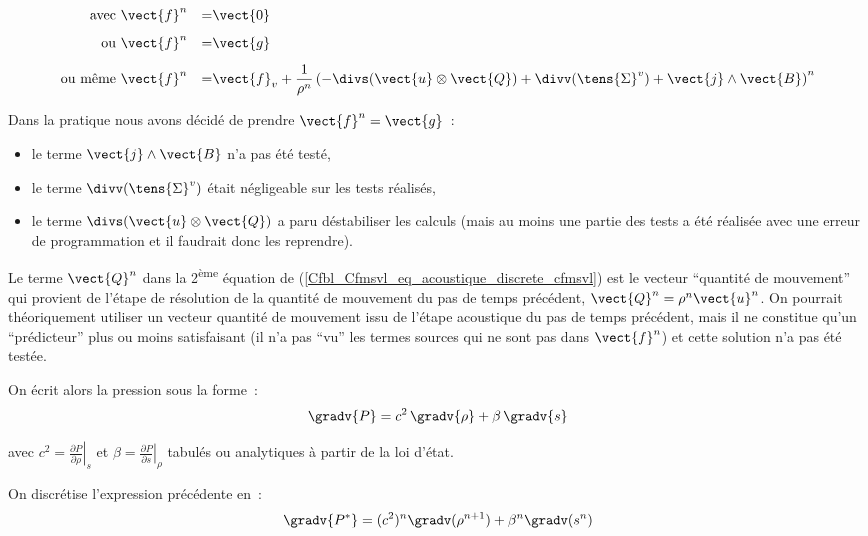 \begin{equation}\label{Cfbl_Cfmsvl_eq_forces_supplementaires_cfmsvl}
\begin{aligned}
\text{avec\ } &\vect{f}^n &=& \vect{0} \\[0.5em]
\text{ou\ } &\vect{f}^n &=& \vect{g} \\[0.5em]
\text{ou même\ } &\vect{f}^n &=& \vect{f}_v
+ \displaystyle\frac{1}{\rho^n}
\left( - \divs(\vect{u} \otimes \vect{Q}) + \divv(\tens{\Sigma}^v)
+ \vect{j}\wedge\vect{B} \right)^n
\end{aligned}
\end{equation}

Dans la pratique nous avons décidé de prendre $\vect{f}^n=\vect{g}$~:
\begin{itemize}
  \item le terme $\vect{j}\wedge\vect{B}$ n'a pas été testé,
  \item le terme $\divv(\tens{\Sigma}^v)$ était négligeable sur les tests
        réalisés,
  \item le terme $\divs(\vect{u} \otimes \vect{Q})$ a paru déstabiliser les
        calculs (mais au moins une partie des tests a été réalisée
        avec une erreur de programmation et il faudrait donc les reprendre).
\end{itemize}
\bigskip

Le terme $\vect{Q}^n$ dans la 2\textsuperscript{ème} équation
de (\ref{Cfbl_Cfmsvl_eq_acoustique_discrete_cfmsvl}) est le vecteur ``quantité de mouvement''
qui provient de l'étape de résolution de la quantité de mouvement du pas
de temps précédent, $\vect{Q}^n = \rho^n \vect{u}^n$.
On pourrait théoriquement utiliser un vecteur quantité de mouvement issu
de l'étape acoustique du pas de temps précédent, mais il ne constitue
qu'un ``prédicteur'' plus ou moins satisfaisant (il n'a pas ``vu'' les termes
sources qui ne sont pas dans  $\vect{f}^n$) et cette solution
n'a pas été testée.

\bigskip
On écrit alors la pression sous la forme~:
\begin{equation}
\gradv{P}=c^2\,\gradv{\rho}+\beta\,\gradv{s}
\end{equation}

avec $c^2 = \left.\displaystyle\frac{\partial P}{\partial \rho}\right|_s$
et $\beta = \left.\displaystyle\frac{\partial P}{\partial s}\right|_\rho$
tabulés ou analytiques à partir de la loi d'état.

On discrétise l'expression précédente en~:
\begin{equation}
\gradv{P^*}=(c^2)^n\gradv(\rho^{n+1})+\beta^n\gradv(s^n)
\end{equation}

